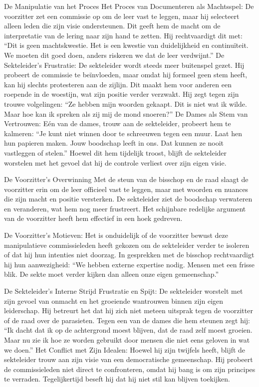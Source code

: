 De Manipulatie van het Proces
Het Proces van Documenteren als Machtsspel:
De voorzitter zet een commissie op om de leer vast te leggen, maar hij selecteert alleen leden die zijn visie ondersteunen. Dit geeft hem de macht om de interpretatie van de lering naar zijn hand te zetten.
Hij rechtvaardigt dit met:
“Dit is geen machtskwestie. Het is een kwestie van duidelijkheid en continuïteit. We moeten dit goed doen, anders riskeren we dat de leer verdwijnt.”
De Sekteleider’s Frustratie:
De sekteleider wordt steeds meer buitenspel gezet. Hij probeert de commissie te beïnvloeden, maar omdat hij formeel geen stem heeft, kan hij slechts protesteren aan de zijlijn. Dit maakt hem voor anderen een roepende in de woestijn, wat zijn positie verder verzwakt.
Hij zegt tegen zijn trouwe volgelingen:
“Ze hebben mijn woorden gekaapt. Dit is niet wat ik wilde. Maar hoe kan ik spreken als zij mij de mond snoeren?”
De Dames als Stem van Vertrouwen:
Eén van de dames, trouw aan de sekteleider, probeert hem te kalmeren:
“Je kunt niet winnen door te schreeuwen tegen een muur. Laat hen hun papieren maken. Jouw boodschap leeft in ons. Dat kunnen ze nooit vastleggen of stelen.”
Hoewel dit hem tijdelijk troost, blijft de sekteleider worstelen met het gevoel dat hij de controle verliest over zijn eigen visie.

De Voorzitter’s Overwinning
Met de steun van de bisschop en de raad slaagt de voorzitter erin om de leer officieel vast te leggen, maar met woorden en nuances die zijn macht en positie versterken.
De sekteleider ziet de boodschap verwateren en veranderen, wat hem nog meer frustreert. Het schijnbare redelijke argument van de voorzitter heeft hem effectief in een hoek gedreven.

De Voorzitter’s Motieven:
Het is onduidelijk of de voorzitter bewust deze manipulatieve commissieleden heeft gekozen om de sekteleider verder te isoleren of dat hij hun intenties niet doorzag. In gesprekken met de bisschop rechtvaardigt hij hun aanwezigheid:
“We hebben externe expertise nodig. Mensen met een frisse blik. De sekte moet verder kijken dan alleen onze eigen gemeenschap.”

De Sekteleider’s Interne Strijd
Frustratie en Spijt:
De sekteleider worstelt met zijn gevoel van onmacht en het groeiende wantrouwen binnen zijn eigen leiderschap. Hij betreurt het dat hij zich niet meteen uitsprak tegen de voorzitter of de raad over de parasieten.
Tegen een van de dames die hem steunen zegt hij:
“Ik dacht dat ik op de achtergrond moest blijven, dat de raad zelf moest groeien. Maar nu zie ik hoe ze worden gebruikt door mensen die niet eens geloven in wat we doen.”
Het Conflict met Zijn Idealen:
Hoewel hij zijn twijfels heeft, blijft de sekteleider trouw aan zijn visie van een democratische gemeenschap. Hij probeert de commissieleden niet direct te confronteren, omdat hij bang is om zijn principes te verraden. Tegelijkertijd beseft hij dat hij niet stil kan blijven toekijken.

